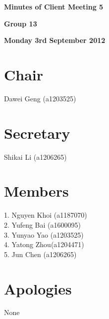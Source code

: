 \documentclass[11pt, a4paper]{article}
\begin{document}


\vspace*{15pt}

\begin{center}
\huge \bf Minutes of Client Meeting 5
\end{center}


\begin{center}
\Large \bf Group 13
\end{center}

\begin{center}
\Large \bf Monday 3rd September 2012
\end{center}

\section*{Chair}
 Dawei Geng (a1203525)

\section*{Secretary}
Shikai Li (a1206265)

\section*{Members}

1. Nguyen Khoi (a1187070)\\
2. Yufeng Bai (a1600095)\\
3. Yunyao Yao (a1203525)\\
4. Yatong Zhou(a1204471)\\
5. Jun Chen (a1206265)
\vspace*{10pt}

\section*{Apologies}
None

\end{document}
